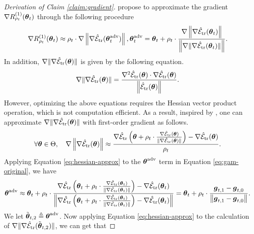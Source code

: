 \begin{proof} [Derivation of Claim \ref{claim:gradient}]
    \cite{Zhang2023GradientNA} propose to approximate the gradient $\nabla R^{(1)}_{\rho_t}(\boldsymbol{\theta}_t)$ through the following procedure
    \begin{equation*}
        \nabla R^{(1)}_{\rho_t}(\boldsymbol{\theta}_t) \approx \rho_t \cdot \nabla \left\|\nabla \hat{\mathcal{E}}_{{\text{tr}}}(\boldsymbol{\theta}^{\text{adv}}_t)\right\|, \boldsymbol{\theta}^{\text{adv}}_t = \boldsymbol{\theta}_t + \rho_t \cdot \frac{\nabla \left\|\nabla \hat{\mathcal{E}}_{{\text{tr}}}(\boldsymbol{\theta}_t)\right\|}{\left\|\nabla \|\nabla \hat{\mathcal{E}}_{{\text{tr}}}(\boldsymbol{\theta}_t)\|\right\|}.
    \end{equation*}
    In addition, $\nabla \|\nabla \hat{\mathcal{E}}_{{\text{tr}}}(\boldsymbol{\theta})\|$ is given by the following equation.
    \begin{equation} \label{eq:gam-original}
        \nabla \|\nabla \hat{\mathcal{E}}_{{\text{tr}}}(\boldsymbol{\theta})\| = \frac{\nabla^2 \hat{\mathcal{E}}_{{\text{tr}}}(\boldsymbol{\theta}) \cdot \nabla \hat{\mathcal{E}}_{{\text{tr}}}(\boldsymbol{\theta})}{\left\|\hat{\mathcal{E}}_{{\text{tr}}}(\boldsymbol{\theta})\right\|}.
    \end{equation}
    However, optimizing the above equations requires the Hessian vector product operation, which is not computation efficient. As a result, inspired by \cite{singh2020woodfisher,zhao2022penalizing},
    one can approximate $\nabla\|\nabla \hat{\mathcal{E}}_{{\text{tr}}}(\boldsymbol{\theta})\|$ with first-order gradient as follows.
    \begin{equation} \label{eq:hessian-approx}
        \forall \boldsymbol{\theta} \in \Theta, \quad \nabla\left\|\nabla \hat{\mathcal{E}}_{{\text{tr}}}(\boldsymbol{\theta})\right\| \approx \frac{\nabla \hat{\mathcal{E}}_{{\text{tr}}}\left(\boldsymbol{\theta} + \rho_t \cdot \frac{\nabla \hat{\mathcal{E}}_{{\text{tr}}}(\boldsymbol{\theta})}{\|\nabla \hat{\mathcal{E}}_{{\text{tr}}}(\boldsymbol{\theta})\|}\right) - \nabla \hat{\mathcal{E}}_{{\text{tr}}}(\boldsymbol{\theta})}{\rho_t}.
    \end{equation}
    Applying Equation \eqref{eq:hessian-approx} to the $\boldsymbol{\theta}^{\text{adv}}$ term in Equation \eqref{eq:gam-original}, we have
    \begin{equation}
        \boldsymbol{\theta}^{\text{adv}} \approx \boldsymbol{\theta}_t + \rho_t \cdot \frac{\nabla \hat{\mathcal{E}}_{{\text{tr}}}\left(\boldsymbol{\theta}_t + \rho_t \cdot \frac{\nabla \hat{\mathcal{E}}_{{\text{tr}}}(\boldsymbol{\theta}_t)}{\|\nabla \hat{\mathcal{E}}_{{\text{tr}}}(\boldsymbol{\theta}_t)\|}\right) - \nabla \hat{\mathcal{E}}_{{\text{tr}}}(\boldsymbol{\theta}_t)}{\left\|\nabla \hat{\mathcal{E}}_{{\text{tr}}}\left(\boldsymbol{\theta}_t + \rho_t \cdot \frac{\nabla \hat{\mathcal{E}}_{{\text{tr}}}(\boldsymbol{\theta}_t)}{\|\nabla \hat{\mathcal{E}}_{{\text{tr}}}(\boldsymbol{\theta}_t)\|}\right) - \nabla \hat{\mathcal{E}}_{{\text{tr}}}(\boldsymbol{\theta}_t)\right\|} = \boldsymbol{\theta}_t + \rho_t \cdot \frac{\boldsymbol{g}_{t,1} - \boldsymbol{g}_{t,0}}{\left\|\boldsymbol{g}_{t,1} - \boldsymbol{g}_{t,0}\right\|}.
    \end{equation}
    We let $\tilde{\boldsymbol{\theta}}_{t,2} \triangleq \boldsymbol{\theta}^{\text{adv}}$. Now applying Equation \eqref{eq:hessian-approx} to the calculation of $\nabla \|\nabla \hat{\mathcal{E}}_{{\text{tr}}}(\tilde{\boldsymbol{\theta}}_{t,2})\|$, we can get that

\end{proof}

